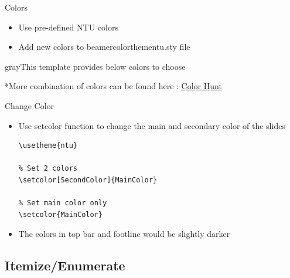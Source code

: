 \documentclass[pdf]{beamer}
\begin{document}
\begin{frame}{Colors}

\begin{itemize}
    \item Use pre-defined NTU colors
    \item Add new colors to \alert{beamercolorthementu.sty} file
\end{itemize}
\vspace{.5cm}
\begin{mybox}{gray}{This template provides below colors to choose}
    \begin{testcolors}[RGB]
        
        
        
    \end{testcolors}
    
    
    
\end{mybox} 
\scriptsize{*More combination of colors can be found here : \href{https://colorhunt.co}{Color Hunt}}
\end{frame}



\begin{frame}[fragile]{Change Color}

\begin{itemize}

\item Use \alert{setcolor} function to change the main and secondary color of the slides
    
\begin{lstlisting}[style=tex]
% Use NTU theme
\usetheme{ntu}

% Set 2 colors
\setcolor[SecondColor]{MainColor}

% Set main color only
\setcolor{MainColor}
\end{lstlisting}

\item The colors in top bar and footline would be slightly darker
    
\end{itemize}

\end{frame}

\subsection{Itemize/Enumerate}
\end{document}
